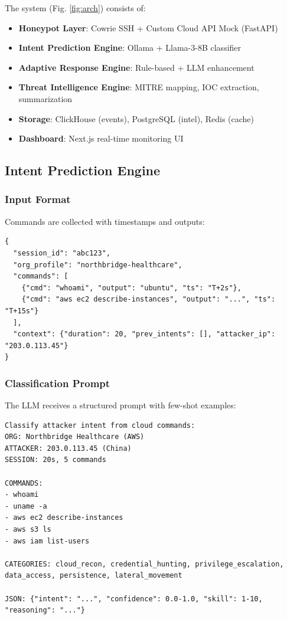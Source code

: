 \documentclass[10pt,conference]{IEEEtran}
\begin{document}
The system (Fig. \ref{fig:arch}) consists of:
\begin{itemize}
    \item \textbf{Honeypot Layer}: Cowrie SSH + Custom Cloud API Mock (FastAPI)
    \item \textbf{Intent Prediction Engine}: Ollama + Llama-3-8B classifier
    \item \textbf{Adaptive Response Engine}: Rule-based + LLM enhancement
    \item \textbf{Threat Intelligence Engine}: MITRE mapping, IOC extraction, summarization
    \item \textbf{Storage}: ClickHouse (events), PostgreSQL (intel), Redis (cache)
    \item \textbf{Dashboard}: Next.js real-time monitoring UI
\end{itemize}

\subsection{Intent Prediction Engine}
\label{sec:intent}

\subsubsection{Input Format}
Commands are collected with timestamps and outputs:
\begin{verbatim}
{
  "session_id": "abc123",
  "org_profile": "northbridge-healthcare",
  "commands": [
    {"cmd": "whoami", "output": "ubuntu", "ts": "T+2s"},
    {"cmd": "aws ec2 describe-instances", "output": "...", "ts": "T+15s"}
  ],
  "context": {"duration": 20, "prev_intents": [], "attacker_ip": "203.0.113.45"}
}
\end{verbatim}

\subsubsection{Classification Prompt}
The LLM receives a structured prompt with few-shot examples:
\begin{verbatim}
Classify attacker intent from cloud commands:
ORG: Northbridge Healthcare (AWS)
ATTACKER: 203.0.113.45 (China)
SESSION: 20s, 5 commands

COMMANDS:
- whoami
- uname -a
- aws ec2 describe-instances
- aws s3 ls
- aws iam list-users

CATEGORIES: cloud_recon, credential_hunting, privilege_escalation,
data_access, persistence, lateral_movement

JSON: {"intent": "...", "confidence": 0.0-1.0, "skill": 1-10, "reasoning": "..."}
\end{verbatim}
\end{document}

